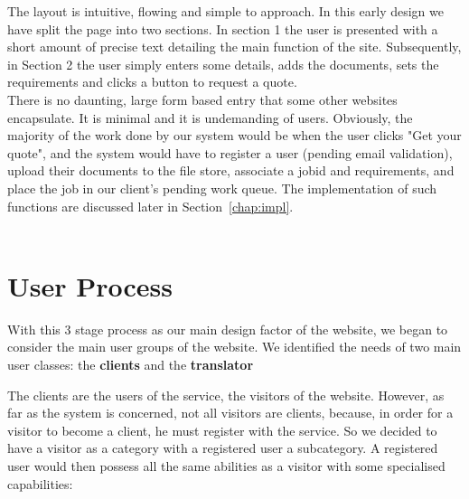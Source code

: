 \documentclass{l3proj}
\begin{document}
The layout is intuitive, flowing and simple to approach. In this early design we have split the page into two sections. In section 1 the user is presented with a short amount of precise text detailing the main function of the site. Subsequently, in Section 2 the user simply enters some details, adds the documents, sets the requirements and clicks a button to request a quote. \\There is no daunting, large form based entry that some other websites encapsulate. It is minimal and it is undemanding of users. Obviously, the majority of the work done by our system would be when the user clicks "Get your quote", and the system would have to register a user (pending email validation), upload their documents to the file store, associate a jobid and requirements, and place the job in our client's pending work queue. The implementation of such functions are discussed later in Section~\ref{chap:impl}.\\
\\


\section{User Process}
With this 3 stage process as our main design factor of the website, we began to consider the main user groups of the website. We identified the needs of two main user classes: the \textbf{clients} and the \textbf{translator}

The clients are the users of the service, the visitors of the website. However, as far as the system is concerned, not all visitors are clients, because, in order for a visitor to become a client, he must register with the service. So we decided to have a visitor as a category with a registered user a subcategory. A registered user would then possess all the same abilities as a visitor with some specialised capabilities:
\end{document}
